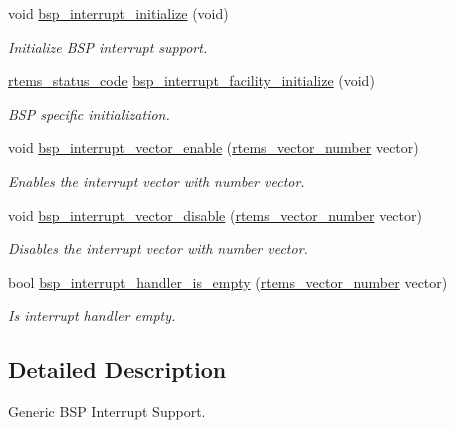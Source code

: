 \begin{DoxyCompactItemize}
void \mbox{\hyperlink{group__bsp__interrupt_gafccb8719531b51a8cf0163febeb42b29}{bsp\+\_\+interrupt\+\_\+initialize}} (void)
\begin{DoxyCompactList}\small\item\em Initialize B\+SP interrupt support. \end{DoxyCompactList}\item 
\mbox{\hyperlink{group__ClassicStatus_ga545d41846817eaba6143d52ee4d9e9fe}{rtems\+\_\+status\+\_\+code}} \mbox{\hyperlink{group__bsp__interrupt_gab114a6e92b17b99bf52cf24d1125a9df}{bsp\+\_\+interrupt\+\_\+facility\+\_\+initialize}} (void)
\begin{DoxyCompactList}\small\item\em B\+SP specific initialization. \end{DoxyCompactList}\item 
void \mbox{\hyperlink{group__bsp__interrupt_ga9968f1703b04b05f4f7e9fc5220da39a}{bsp\+\_\+interrupt\+\_\+vector\+\_\+enable}} (\mbox{\hyperlink{group__ClassicINTR_ga3e434c197d99f128e78cae4d9358bd8b}{rtems\+\_\+vector\+\_\+number}} vector)
\begin{DoxyCompactList}\small\item\em Enables the interrupt vector with number {\itshape vector}. \end{DoxyCompactList}\item 
void \mbox{\hyperlink{group__bsp__interrupt_ga5428b914d0cb037e9b3f7cb2b758cabd}{bsp\+\_\+interrupt\+\_\+vector\+\_\+disable}} (\mbox{\hyperlink{group__ClassicINTR_ga3e434c197d99f128e78cae4d9358bd8b}{rtems\+\_\+vector\+\_\+number}} vector)
\begin{DoxyCompactList}\small\item\em Disables the interrupt vector with number {\itshape vector}. \end{DoxyCompactList}\item 
bool \mbox{\hyperlink{group__bsp__interrupt_ga0ab406af223fad2abc336b84597c7008}{bsp\+\_\+interrupt\+\_\+handler\+\_\+is\+\_\+empty}} (\mbox{\hyperlink{group__ClassicINTR_ga3e434c197d99f128e78cae4d9358bd8b}{rtems\+\_\+vector\+\_\+number}} vector)
\begin{DoxyCompactList}\small\item\em Is interrupt handler empty. \end{DoxyCompactList}\end{DoxyCompactItemize}


\subsection{Detailed Description}
Generic B\+SP Interrupt Support. 

